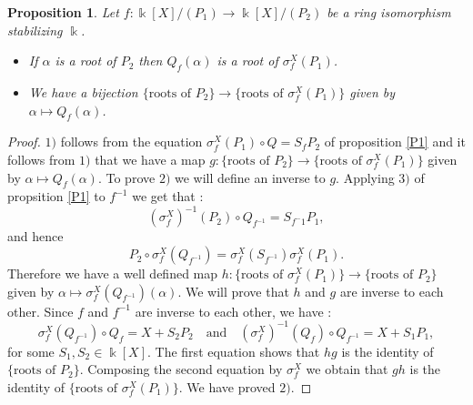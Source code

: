 \documentclass[12pt, reqno]{amsart}
\newtheorem{proposition}[theorem]{Proposition}
\newcommand{\K}{ {\Bbbk} }
\newcommand{\KP}{{\Bbbk[X]/(P_1)}}
\newcommand{\KPP}{{\Bbbk[X]/(P_2)}}
\begin{document}
\begin{proposition}
Let $f: \KP\to \KPP$ be a ring isomorphism stabilizing $\K$.
\begin{itemize}
\item[1)] If $\alpha$ is a root of $P_2$ then $Q_f(\alpha)$ is a root of $\sigma_f^X(P_1)$.
\item[2)] We have a bijection $\{\text{roots of } P_2\}\rightarrow \{\text{roots of } \sigma_f^X(P_1)\}$ given by $\alpha \mapsto Q_f(\alpha)$.
\end{itemize}
\end{proposition}
\begin{proof}
$1)$ follows from the equation $\sigma_f^X(P_1)\circ Q= S_f P_2$ of proposition \ref{P1} and it follows from $1)$ that we have a map $g: \{\text{roots of } P_2\}\rightarrow \{\text{roots of } \sigma_f^X(P_1)\}$ given by $\alpha \mapsto Q_f(\alpha)$. To prove $2)$ we will define an inverse to $g$. Applying $3)$ of propsition \ref{P1} to $f^{-1}$ we get that :
$$(\sigma_f^X)^{-1}(P_2)\circ Q_{f^{-1}}=S_{f^-1}P_1,$$
and hence $$P_2 \circ \sigma_f^X(Q_{f^{-1}})=\sigma_f^X (S_{f^{-1}})\sigma_f^X (P_1).$$
Therefore we have a well defined map  $h:\{\text{roots of } \sigma_f^X(P_1)\} \to \{\text{roots of } P_2\}$ given by $\alpha\mapsto \sigma_f^X(Q_{f^{-1}})(\alpha)$. We will prove that $h$ and $g$ are inverse to each other.  Since $f$ and $f^{-1}$ are inverse to each other, we have :
$$ \sigma_f^X(Q_{f^{-1}})\circ Q_f = X +S_2P_2 \quad \text{and} \quad (\sigma_f^X)^{-1}(Q_f)\circ Q_{f^{-1}}=X+S_1 P_1,$$ 
for some $S_1,S_2 \in \K[X]$. The first equation shows that $hg$ is the identity of $\{\text{roots of } P_2\}$. Composing the second equation by $\sigma_f^X$ we obtain that $gh$ is the identity of $\{\text{roots of } \sigma_f^X(P_1)\}$. We have proved $2)$.
\end{proof}
\end{document}
